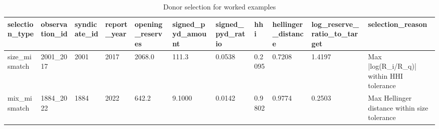 \begin{table}[htbp]
\centering
\caption{Donor selection for worked examples}
\label{tab:v1_donor_selection}
\begin{tabular}{lllllllllll}
\toprule
\textbf{selection_type} & \textbf{observation_id} & \textbf{syndicate_id} & \textbf{report_year} & \textbf{opening_reserves} & \textbf{signed_pyd_amount} & \textbf{signed_pyd_ratio} & \textbf{hhi} & \textbf{hellinger_distance} & \textbf{log_reserve_ratio_to_target} & \textbf{selection_reason} \\
\midrule
size_mismatch & 2001_2017 & 2001 & 2017 & 2068.0 & 111.3 & 0.0538 & 0.2095 & 0.7208 & 1.4197 & Max |log(R_i/R_q)| within HHI tolerance \\
mix_mismatch & 1884_2022 & 1884 & 2022 & 642.2 & 9.1000 & 0.0142 & 0.9802 & 0.9774 & 0.2503 & Max Hellinger distance within size tolerance \\
\bottomrule
\end{tabular}
\end{table}
